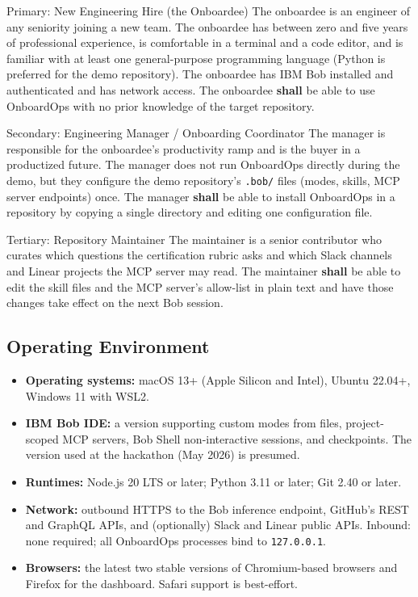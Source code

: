 \documentclass[11pt,letterpaper]{article}
\newcommand{\shall}{\textbf{shall}}
\begin{document}
\begin{reqbox}{Primary: New Engineering Hire (the Onboardee)}
The onboardee is an engineer of any seniority joining a new team. The onboardee has between zero and five years of professional experience, is comfortable in a terminal and a code editor, and is familiar with at least one general-purpose programming language (Python is preferred for the demo repository). The onboardee has IBM Bob installed and authenticated and has network access. The onboardee \shall{} be able to use OnboardOps with no prior knowledge of the target repository.
\end{reqbox}

\begin{reqbox}{Secondary: Engineering Manager / Onboarding Coordinator}
The manager is responsible for the onboardee's productivity ramp and is the buyer in a productized future. The manager does not run OnboardOps directly during the demo, but they configure the demo repository's \texttt{.bob/} files (modes, skills, MCP server endpoints) once. The manager \shall{} be able to install OnboardOps in a repository by copying a single directory and editing one configuration file.
\end{reqbox}

\begin{reqbox}{Tertiary: Repository Maintainer}
The maintainer is a senior contributor who curates which questions the certification rubric asks and which Slack channels and Linear projects the MCP server may read. The maintainer \shall{} be able to edit the skill files and the MCP server's allow-list in plain text and have those changes take effect on the next Bob session.
\end{reqbox}

\subsection{Operating Environment}

\begin{itemize}
  \item \textbf{Operating systems:} macOS 13+ (Apple Silicon and Intel), Ubuntu 22.04+, Windows 11 with WSL2.
  \item \textbf{IBM Bob IDE:} a version supporting custom modes from files, project-scoped MCP servers, Bob Shell non-interactive sessions, and checkpoints. The version used at the hackathon (May 2026) is presumed.
  \item \textbf{Runtimes:} Node.js 20 LTS or later; Python 3.11 or later; Git 2.40 or later.
  \item \textbf{Network:} outbound HTTPS to the Bob inference endpoint, GitHub's REST and GraphQL APIs, and (optionally) Slack and Linear public APIs. Inbound: none required; all OnboardOps processes bind to \texttt{127.0.0.1}.
  \item \textbf{Browsers:} the latest two stable versions of Chromium-based browsers and Firefox for the dashboard. Safari support is best-effort.
\end{itemize}
\end{document}
